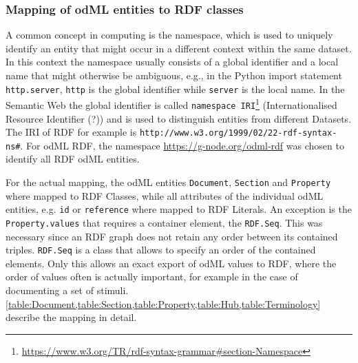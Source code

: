 \documentclass{article}
\begin{document}
\subsubsection{Mapping of odML entities to RDF classes} \label{sec:odml_rdf_mapping}

A common concept in computing is the namespace, which is used to uniquely identify an entity that might occur in a different context within the same dataset. In this context the namespace usually consists of a global identifier and a local name that might otherwise be ambiguous, e.g., in the Python import statement \texttt{http.server}, \texttt{http} is the global identifier while \texttt{server} is the local name.
In the Semantic Web the global identifier is called \texttt{namespace IRI}\footnote{\url{https://www.w3.org/TR/rdf-syntax-grammar\#section-Namespace}} (Internationalised Resource Identifier (?)) and is used to distinguish entities from different Datasets. The IRI of RDF for example is \texttt{http://www.w3.org/1999/02/22-rdf-syntax-ns\#}. For odML RDF, the namespace \url{https://g-node.org/odml-rdf} was chosen to identify all RDF odML entities.

For the actual mapping, the odML entities \texttt{Document}, \texttt{Section} and \texttt{Property} where mapped to RDF Classes, while all attributes of the individual odML entities, e.g. \texttt{id} or \texttt{reference} where mapped to RDF Literals. An exception is the \texttt{Property.values} that requires a container element, the \texttt{RDF.Seq}. This was necessary since an RDF graph does not retain any order between its contained triples. \texttt{RDF.Seq} is a class that allows to specify an order of the contained elements. Only this allows an exact export of odML values to RDF, where the order of values often is actually important, for example in the case of documenting a set of stimuli. \cref{table:Document,table:Section,table:Property,table:Hub,table:Terminology} describe the mapping in detail.
\end{document}
